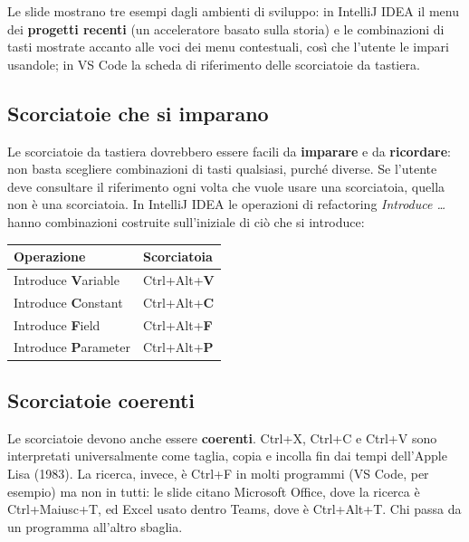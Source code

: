 Le slide mostrano tre esempi dagli ambienti di sviluppo: in IntelliJ IDEA il menu dei \textbf{progetti recenti} (un
acceleratore basato sulla storia) e le combinazioni di tasti mostrate accanto alle voci dei menu contestuali, così che
l'utente le impari usandole; in VS Code la scheda di riferimento delle scorciatoie da tastiera.

\subsection{Scorciatoie che si imparano}

Le scorciatoie da tastiera dovrebbero essere facili da \textbf{imparare} e da \textbf{ricordare}: non basta scegliere
combinazioni di tasti qualsiasi, purché diverse. Se l'utente deve consultare il riferimento ogni volta che vuole usare
una scorciatoia, quella non è una scorciatoia. In IntelliJ IDEA le operazioni di refactoring \textit{Introduce \ldots}
hanno combinazioni costruite sull'iniziale di ciò che si introduce:

\begin{center}
\renewcommand{\arraystretch}{1.2}
\begin{tabular}{@{}ll@{}}
  \toprule
  \textbf{Operazione} & \textbf{Scorciatoia} \\ \midrule
  Introduce \textbf{V}ariable & Ctrl+Alt+\textbf{V} \\
  Introduce \textbf{C}onstant & Ctrl+Alt+\textbf{C} \\
  Introduce \textbf{F}ield & Ctrl+Alt+\textbf{F} \\
  Introduce \textbf{P}arameter & Ctrl+Alt+\textbf{P} \\
  \bottomrule
\end{tabular}
\end{center}

\subsection{Scorciatoie coerenti}

Le scorciatoie devono anche essere \textbf{coerenti}. Ctrl+X, Ctrl+C e Ctrl+V sono interpretati universalmente come
taglia, copia e incolla fin dai tempi dell'Apple Lisa (1983). La ricerca, invece, è Ctrl+F in molti programmi (VS Code,
per esempio) ma non in tutti: le slide citano Microsoft Office, dove la ricerca è Ctrl+Maiusc+T, ed Excel usato dentro
Teams, dove è Ctrl+Alt+T. Chi passa da un programma all'altro sbaglia.

